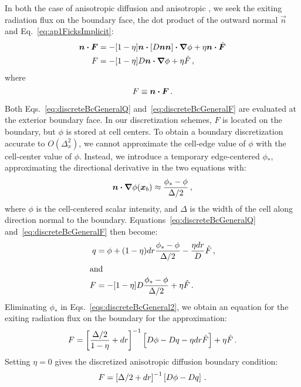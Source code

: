 In both the case of anisotropic diffusion and anisotropic \Pone, we seek the
exiting radiation flux on the boundary face, the dot
product of the outward normal $\vec{n}$ and Eq.~\eqref{eq:ap1FicksImplicit}:
\begin{align}\nonumber
  \bm{n} \bm{\cdot}\bm{F}
  &= - [1 - \eta]\bm{n} \bm{\cdot} \left[ D \bm{n} \bm{n}  \right] \bm{\cdot} \bm{\nabla} \phi
  + \eta \bm{n} \bm{\cdot}\hat{\bm{F}}
  \\ \label{eq:discreteBcGeneralF}
  F &= - [1 - \eta] D \bm{n} \bm{\cdot} \bm{\nabla} \phi + \eta \hat{F} \,,
\end{align}
where
\begin{equation*}
  F \equiv \bm{n} \bm{\cdot} \bm{F} \,.
\end{equation*}

Both Eqs.~\eqref{eq:discreteBcGeneralQ} and~\eqref{eq:discreteBcGeneralF}
are evaluated at the exterior boundary face.  In our discretization schemes, 
$F$ is located on the boundary, but $\phi$ is stored at cell centers.
To obtain a
boundary discretization accurate to $O(\Delta_x^2)$, we cannot approximate the
cell-edge value of $\phi$ with the cell-center value of $\phi$. Instead, we
introduce a temporary edge-centered $\phi_*$, approximating the directional
derivative in the two equations with:
\begin{equation*}
  \bm{n} \bm{\cdot} \bm{\nabla} \phi(\bm{x}_b) \approx \frac{\phi_* - \phi}{\Delta/2}\,,
\end{equation*}
where $\phi$ is the cell-centered scalar intensity, and $\Delta$ is the width of
the cell along direction normal to the boundary. Equations~\eqref{eq:discreteBcGeneralQ}
and~\eqref{eq:discreteBcGeneralF} then become:
\begin{subequations}\label{eqs:discreteBcGeneral2}
  \begin{align}\label{eq:discreteBcGeneralQ2}
 q &=  \phi + (1 - \eta) dr \frac{\phi_* - \phi}{\Delta/2}
  - \frac{\eta dr}{D} \hat{F} \,,
  \\ 
  \intertext{and} \label{eq:discreteBcGeneralF2}
  F &= - [1 - \eta] D\frac{\phi_* - \phi}{\Delta/2} + \eta \hat{F} \,.
  \end{align}
\end{subequations}
Eliminating $\phi_*$ in Eqs.~\eqref{eqs:discreteBcGeneral2},
we obtain an equation for the exiting
radiation flux on the boundary for the \APone approximation:
\begin{equation}\label{eq:discreteBcAponeFinal}
  F = \left[ \frac{\Delta/2}{1 - \eta} + dr \right]^{-1}
  \left[ D\phi - Dq - \eta dr \hat{F} \right]
  + \eta \hat{F} \,.
\end{equation}
Setting $\eta=0$ gives the discretized anisotropic diffusion boundary condition:
\begin{equation}\label{eq:discreteBcAdFinal}
  F = \left[ \Delta/2 + dr \right]^{-1} \left[ D\phi - Dq  \right] \,.
\end{equation}


